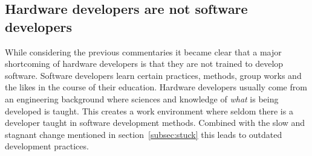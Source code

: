 \documentclass[11pt,british]{article}
\begin{document}
\subsection{Hardware developers are not software developers}
While considering the previous commentaries it became clear that a major shortcoming of hardware developers is that they are not trained to develop software. Software developers learn certain practices, methods, group works and the likes in the course of their education. Hardware developers usually come from an engineering background where sciences and knowledge of \emph{what} is being developed is taught. This creates a work environment where seldom there is a developer taught in software development methods. Combined with the slow and stagnant change mentioned in section~\ref{subsec:stuck} this leads to outdated development practices.

\newpage{}
\end{document}
